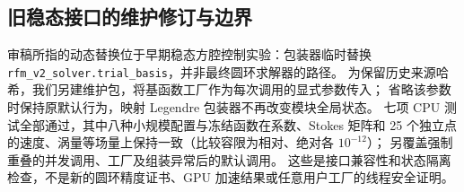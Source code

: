 \subsection{旧稳态接口的维护修订与边界}
审稿所指的动态替换位于早期稳态方腔控制实验：包装器临时替换
\texttt{rfm\_v2\_solver.trial\_basis}，并非最终圆环求解器的路径。
为保留历史来源哈希，我们另建维护包，将基函数工厂作为每次调用的显式参数传入；
省略该参数时保持原默认行为，映射 Legendre 包装器不再改变模块全局状态。
七项 CPU 测试全部通过，其中八种小规模配置与冻结函数在系数、Stokes 矩阵和
25 个独立点的速度、涡量等场量上保持一致（比较容限为相对、绝对各 $10^{-12}$）；
另覆盖强制重叠的并发调用、工厂及组装异常后的默认调用。
这些是接口兼容性和状态隔离检查，不是新的圆环精度证书、GPU 加速结果或任意用户工厂的线程安全证明。
